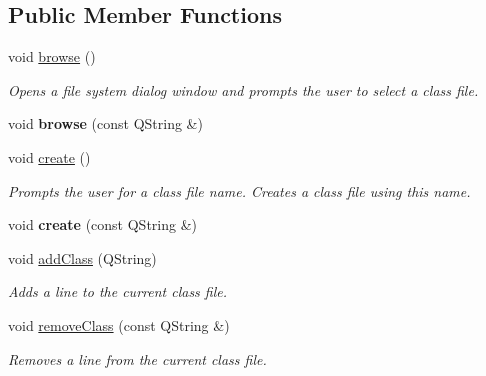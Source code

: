 \subsection*{Public Member Functions}
\begin{DoxyCompactItemize}
\item 
\mbox{\label{classClassModel_a275d7d723cceff7cddea637e29bb5489}} 
void \hyperlink{classClassModel_a275d7d723cceff7cddea637e29bb5489}{browse} ()
\begin{DoxyCompactList}\small\item\em Opens a file system dialog window and prompts the user to select a class file. \end{DoxyCompactList}\item 
\mbox{\label{classClassModel_a1fb7006db6a2aab398a7c82cab2da568}} 
void {\bfseries browse} (const Q\+String \&)
\item 
\mbox{\label{classClassModel_afb5c974408ff462e812df971588ea703}} 
void \hyperlink{classClassModel_afb5c974408ff462e812df971588ea703}{create} ()
\begin{DoxyCompactList}\small\item\em Prompts the user for a class file name. Creates a class file using this name. \end{DoxyCompactList}\item 
\mbox{\label{classClassModel_ad2e5262948d7491cf1f8bfd305dff829}} 
void {\bfseries create} (const Q\+String \&)
\item 
void \hyperlink{classClassModel_ab96bae16ed8f02abf2eca0d7b89a8a62}{add\+Class} (Q\+String)
\begin{DoxyCompactList}\small\item\em Adds a line to the current class file. \end{DoxyCompactList}\item 
void \hyperlink{classClassModel_afe2266d404da4bab25bf193212fed198}{remove\+Class} (const Q\+String \&)
\begin{DoxyCompactList}\small\item\em Removes a line from the current class file. \end{DoxyCompactList}\item 
\mbox{\label{classClassModel_a2c8e221161022e6dbe09d07e7fea4422}} 

\end{DoxyCompactItemize}
